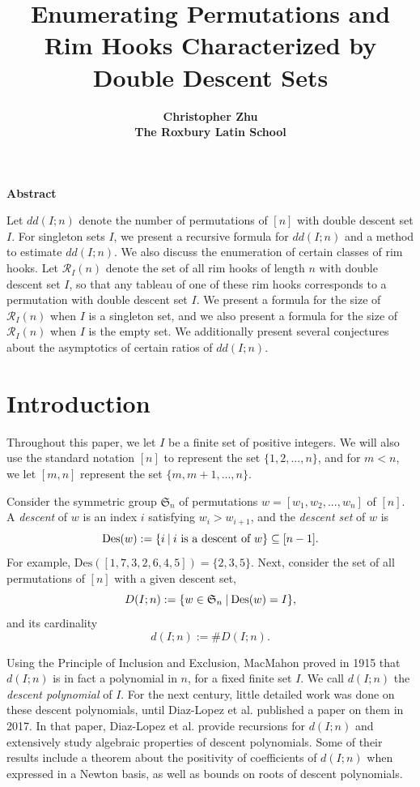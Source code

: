 \documentclass[11pt, a4paper, reqno]{article}
\date{}
\title{\textbf{Enumerating Permutations and Rim Hooks Characterized by Double Descent Sets}}
\author{\textbf{Christopher Zhu}\\\textbf{The Roxbury Latin School}}
\numberwithin{equation}{section}
\newcommand{\s}{\hspace{0.08cm}}
\theoremstyle{definition}
\begin{document}
	\maketitle
	\vspace{-0.7cm}
	
	
	\vspace{0.5cm}
	
	\begin{center}
	    \textbf{Abstract}
	\end{center}
	
	 Let $dd(I;n)$ denote the number of permutations of $[n]$ with double descent set $I$. For singleton sets $I$, we present a recursive formula for $dd(I;n)$ and a method to estimate $dd(I;n)$. We also discuss the enumeration of certain classes of rim hooks. Let $\mathcal{R}_I(n)$ denote the set of all rim hooks of length $n$ with double descent set $I$, so that any tableau of one of these rim hooks corresponds to a permutation with double descent set $I$. We present a formula for the size of $\mathcal{R}_I(n)$ when $I$ is a singleton set, and we also present a formula for the size of $\mathcal{R}_I(n)$ when $I$ is the empty set. We additionally present several conjectures about the asymptotics of certain ratios of $dd(I;n)$.
	
	\vspace{1cm}
	
	\tableofcontents
	
	
	\section{Introduction}
	 Throughout this paper, we let $I$ be a finite set of positive integers. We will also use the standard notation $[n]$ to represent the set $\{1, 2, ..., n\}$, and for $m<n$, we let $[m, n]$ represent the set $\{m, m+1, ..., n\}$.
	
	 Consider the symmetric group $\mathfrak{S}_n$ of permutations $w = [w_1,w_2,...,w_n]$ of $[n]$. A \textit{descent} of $w$ is an index $i$ satisfying $w_i > w_{i+1}$, and the \textit{descent set} of $w$ is $$\text{Des}(w) := \{i\s|\s i\text{ is a descent of }w\} \subseteq [n-1].$$ For example, $\text{Des}([1,7,3,2,6,4,5]) = \{2, 3, 5\}$. Next, consider the set of all permutations of $[n]$ with a given descent set, $$D(I;n) := \{w \in \mathfrak{S}_n \s|\s \text{Des}(w) = I \},$$ and its cardinality $$d(I;n) := \#D(I;n).$$ 
	
	 Using the Principle of Inclusion and Exclusion, MacMahon \cite{mac} proved in 1915 that $d(I;n)$ is in fact a polynomial in $n$, for a fixed finite set $I$. We call $d(I;n)$ the \textit{descent polynomial} of $I$. For the next century, little detailed work was done on these descent polynomials, until Diaz-Lopez et al. \cite{DLHIOS} published a paper on them in 2017. In that paper, Diaz-Lopez et al. provide recursions for $d(I;n)$ and extensively study algebraic properties of descent polynomials. Some of their results include a theorem about the positivity of coefficients of $d(I;n)$ when expressed in a Newton basis, as well as bounds on roots of descent polynomials.
\end{document}
